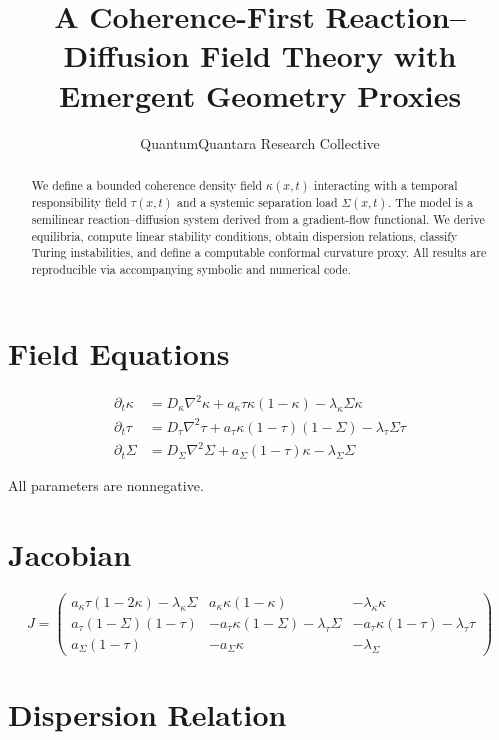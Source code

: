 \documentclass[11pt]{article}
\title{A Coherence-First Reaction–Diffusion Field Theory with Emergent Geometry Proxies}
\author[1]{QuantumQuantara Research Collective}
\affil[1]{coherence\_spacetime\_lattice}
\date{}
\newcommand{\kappaF}{\kappa}
\newcommand{\tauF}{\tau}
\newcommand{\SigmaF}{\Sigma}
\begin{document}
\maketitle

\begin{abstract}
We define a bounded coherence density field $\kappaF(x,t)$ interacting with a temporal
responsibility field $\tauF(x,t)$ and a systemic separation load $\SigmaF(x,t)$.
The model is a semilinear reaction–diffusion system derived from a gradient-flow functional.
We derive equilibria, compute linear stability conditions, obtain dispersion relations,
classify Turing instabilities, and define a computable conformal curvature proxy.
All results are reproducible via accompanying symbolic and numerical code.
\end{abstract}

\section{Field Equations}

\begin{align}
\partial_t \kappaF &= D_\kappa \nabla^2 \kappaF + a_\kappa \tauF \kappaF (1-\kappaF) - \lambda_\kappa \SigmaF \kappaF \\
\partial_t \tauF &= D_\tau \nabla^2 \tauF + a_\tau \kappaF (1-\tauF)(1-\SigmaF) - \lambda_\tau \SigmaF \tauF \\
\partial_t \SigmaF &= D_\Sigma \nabla^2 \SigmaF + a_\Sigma (1-\tauF)\kappaF - \lambda_\Sigma \SigmaF
\end{align}

All parameters are nonnegative.

\section{Jacobian}

\[
J =
\begin{pmatrix}
a_\kappa\tauF(1-2\kappaF)-\lambda_\kappa\SigmaF &
a_\kappa\kappaF(1-\kappaF) &
-\lambda_\kappa\kappaF \\
a_\tau(1-\SigmaF)(1-\tauF) &
-a_\tau\kappaF(1-\SigmaF)-\lambda_\tau\SigmaF &
-a_\tau\kappaF(1-\tauF)-\lambda_\tau\tauF \\
a_\Sigma(1-\tauF) &
-a_\Sigma\kappaF &
-\lambda_\Sigma
\end{pmatrix}
\]

\section{Dispersion Relation}
\end{document}
